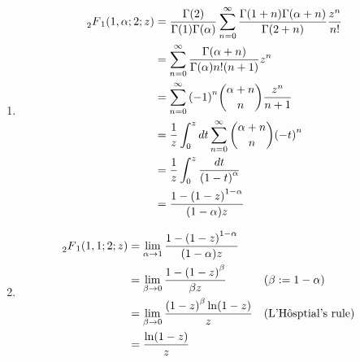 \item

\begin{enumerate}[wide, labelindent = 0pt, label = (\alph*)]
\item
\begin{align*}
    \prescript{}{2}{F}_{1} (1, \alpha; 2; z)
    &= \frac{\Gamma(2)}{\Gamma(1) \Gamma(\alpha)}
       \sum_{n = 0}^\infty \frac{\Gamma(1 + n) \Gamma(\alpha + n)}{\Gamma(2 + n)} \frac{z^n}{n!} \\
    &= \sum_{n = 0}^\infty \frac{\Gamma(\alpha + n)}{\Gamma(\alpha)n! (n + 1)} z^n \\
    &= \sum_{n = 0}^\infty {(-1)}^n \binom{\alpha + n}{n} \frac{z^n}{n + 1} \\
    &= \frac{1}{z} \int_0^z dt \sum_{n = 0}^\infty \binom{\alpha + n}{n} {(-t)}^n \\
    &= \frac{1}{z} \int_0^z \frac{dt}{{(1 - t)}^\alpha} \\
    &= \frac{1 - {(1 - z)}^{1 - \alpha}}{(1 - \alpha) z}
\end{align*}

\item
\begin{align*}
    \prescript{}{2}{F}_{1} (1, 1; 2; z)
    &= \lim_{\alpha \rightarrow 1} \frac{1 - {(1 - z)}^{1 - \alpha}}{(1 - \alpha) z} \\
    &= \lim_{\beta \rightarrow 0} \frac{1 - {(1 - z)}^\beta}{\beta z}
    && (\beta := 1 - \alpha) \\
    &= \lim_{\beta \rightarrow 0} \frac{{(1 - z)}^\beta \ln(1 - z)}{z}
    && (\text{L'H\^osptial's rule}) \\
    &= \frac{\ln (1 - z)}{z}
\end{align*}
\end{enumerate}
